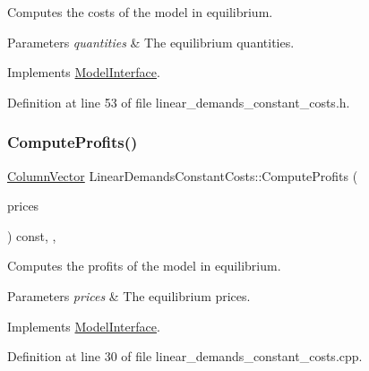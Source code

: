 Computes the costs of the model in equilibrium.


\begin{DoxyParams}{Parameters}
{\em quantities} & The equilibrium quantities. \\
\hline
\end{DoxyParams}


Implements \hyperlink{classModelInterface_ac0a7cc3db9fc177dc75f16abf00275a7}{Model\+Interface}.



Definition at line 53 of file linear\+\_\+demands\+\_\+constant\+\_\+costs.\+h.

\mbox{\label{classLinearDemandsConstantCosts_a48b52dab01d2cf45beae51eab615f7ae}} 
\subsubsection{\texorpdfstring{Compute\+Profits()}{ComputeProfits()}}
{\footnotesize\ttfamily \hyperlink{classColumnVector}{Column\+Vector} Linear\+Demands\+Constant\+Costs\+::\+Compute\+Profits (\begin{DoxyParamCaption}\item[{\hyperlink{classColumnVector}{Column\+Vector} const \&}]{prices }\end{DoxyParamCaption}) const\hspace{0.3cm}{\ttfamily [final]}, {\ttfamily [override]}, {\ttfamily [virtual]}}

Computes the profits of the model in equilibrium.


\begin{DoxyParams}{Parameters}
{\em prices} & The equilibrium prices. \\
\hline
\end{DoxyParams}


Implements \hyperlink{classModelInterface_a311a000060cece8fc1058cd27bf07864}{Model\+Interface}.



Definition at line 30 of file linear\+\_\+demands\+\_\+constant\+\_\+costs.\+cpp.

\mbox{\label{classLinearDemandsConstantCosts_a310864e458935098502561540a71a88c}} 
